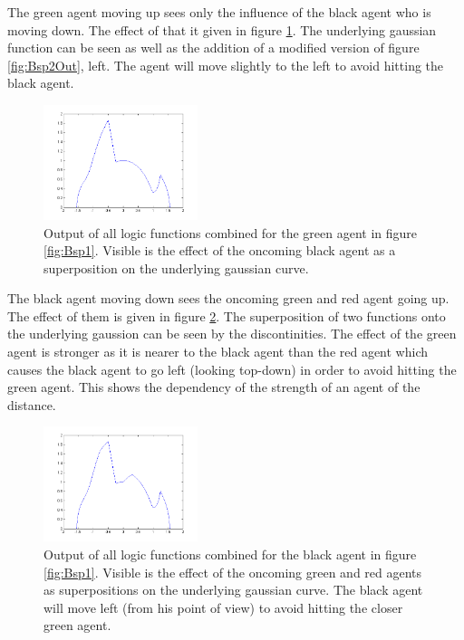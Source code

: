 \noi The green agent moving up sees only the influence of the black agent who is moving down. The effect of that it given in figure \ref{fig:Bsp1Mitte}. The underlying gaussian function can be seen as well as the addition of a modified version of figure \ref{fig:Bsp2Out}, left. The agent will move slightly to the left to avoid hitting the black agent.\\
\begin{figure}[h!]
	\centering
		\includegraphics[width=0.40\textwidth]{pictures/Bsp1Mitte}
	\caption{Output of all logic functions combined for the green agent in figure \ref{fig:Bsp1}. Visible is the effect of the oncoming black agent as a superposition on the underlying gaussian curve.}
	\label{fig:Bsp1Mitte}
\end{figure}

\noi The black agent moving down sees the oncoming green and red agent going up. The effect of them is given in figure \ref{fig:Bsp1ObenRechts}. The superposition of two functions onto the underlying gaussion can be seen by the discontinities. The effect of the green agent is stronger as it is nearer to the black agent than the red agent which causes the black agent to go left (looking top-down) in order to avoid hitting the green agent. This shows the dependency of the strength of an agent of the distance.
\begin{figure}[h!]
	\centering
		\includegraphics[width=0.40\textwidth]{pictures/Bsp1ObenRechts}
	\caption{Output of all logic functions combined for the black agent in figure \ref{fig:Bsp1}. Visible is the effect of the oncoming green and red agents as superpositions on the underlying gaussian curve. The black agent will move left (from his point of view) to avoid hitting the closer green agent.}
	\label{fig:Bsp1ObenRechts}
\end{figure}


